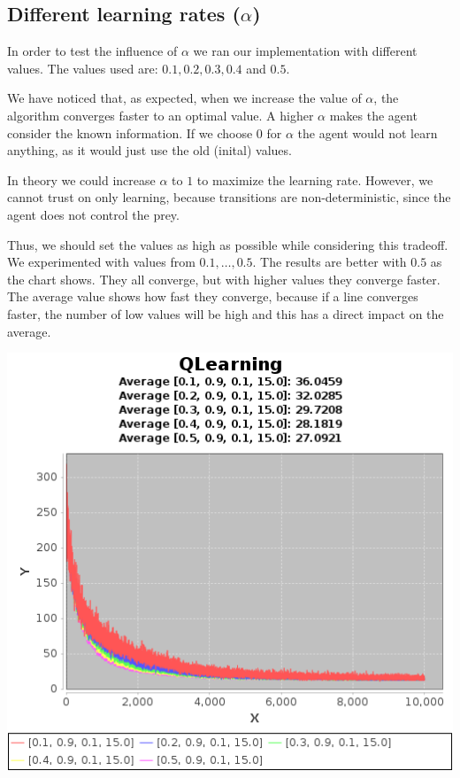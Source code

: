 \documentclass{article}
\begin{document}
\subsection{Different learning rates ($\alpha$)}
In order to test the influence of $\alpha$ we ran our implementation with
different values. The values used are:
$0.1 , 0.2, 0.3, 0.4$ and $0.5$. 

We have noticed that, as expected, when we increase the value of $\alpha$, the 
algorithm converges faster to an optimal value. A higher $\alpha$  makes the agent
consider the known information. If we choose $0$ for $\alpha$ the agent
would not learn anything, as it would just use the old (inital) values.

In theory we could increase $\alpha$ to $1$ to maximize the learning rate. However, we cannot trust on only learning, because transitions are non-deterministic, since the agent does not control the prey.

Thus, we should set the values as high as possible while considering this tradeoff.
We experimented with values from $0.1, \ldots , 0.5$. The results are
better with $0.5$ as the chart shows. They all converge, but with higher values
they converge faster. The average value shows how fast they converge, because if
a line converges faster, the number of low values will be high and this has a
direct impact on the average.

\includegraphics[]{res/alpha_01_to_05_gama_09_epsilon_01_IV_15.png}
\end{document}
